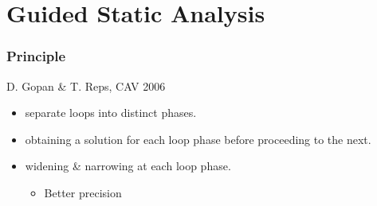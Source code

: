 \documentclass{beamer}
\begin{document}
\section[Guided Analysis]{Guided Static Analysis}

\begin{frame}
  \frametitle{Principle}

D. Gopan \& T. Reps, CAV 2006
\bigskip
\begin{itemize}
\item separate loops into distinct phases.
\item obtaining a solution for each loop phase before proceeding to the next.
\item widening \& narrowing at each loop phase.
\begin{itemize}
\item Better precision
\end{itemize}
\end{itemize}
\end{frame}
\end{document}
